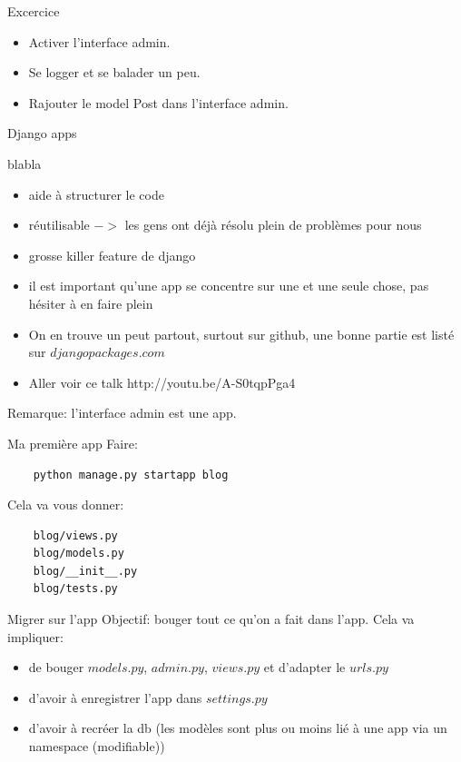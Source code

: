 \documentclass{beamer}
\begin{document}
\begin{frame}[fragile]{Excercice}
    \begin{itemize}
        \item Activer l'interface admin.
        \item Se logger et se balader un peu.
        \item Rajouter le model Post dans l'interface admin.
    \end{itemize}
\end{frame}

\begin{frame}[fragile]{}
\begin{LARGE}
\begin{center}
Django apps
\end{center}
\end{LARGE}
\end{frame}

\begin{frame}[fragile]{blabla}
    \begin{itemize}
        \item aide à structurer le code\pause
        \item réutilisable $->$ les gens ont déjà résolu plein de problèmes pour nous\pause
        \item grosse killer feature de django\pause
        \item il est important qu'une app se concentre sur une et une seule chose, pas hésiter à en faire plein\pause
        \item On en trouve un peut partout, surtout sur github, une bonne partie est listé sur $djangopackages.com$\pause
        \item Aller voir ce talk http://youtu.be/A-S0tqpPga4\pause
    \end{itemize}
    Remarque: l'interface admin est une app.
\end{frame}

\begin{frame}[fragile]{Ma première app}
    Faire:
\begin{verbatim}
    python manage.py startapp blog
\end{verbatim}
\pause

    Cela va vous donner:
\begin{verbatim}
    blog/views.py
    blog/models.py
    blog/__init__.py
    blog/tests.py
\end{verbatim}
\end{frame}

\begin{frame}[fragile]{Migrer sur l'app}
    Objectif: bouger tout ce qu'on a fait dans l'app. Cela va impliquer:
    \begin{itemize}
        \item de bouger $models.py$, $admin.py$, $views.py$ et d'adapter le $urls.py$
        \item d'avoir à enregistrer l'app dans $settings.py$
        \item d'avoir à recréer la db (les modèles sont plus ou moins lié à une app via un namespace (modifiable))
    \end{itemize}
\end{frame}
\end{document}

